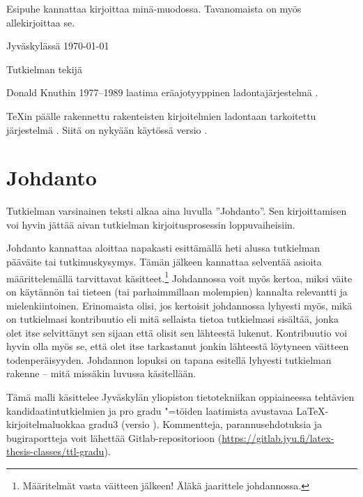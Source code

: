 \documentclass[utf8]{gradu3}
\begin{document}
Esipuhe kannattaa kirjoittaa minä-muodossa. Tavanomaista on myös
allekirjoittaa se.

Jyväskylässä \today

\bigskip

Tutkielman tekijä

\begin{thetermlist}
\item[\TeX] Donald Knuthin 1977--1989 laatima eräajotyyppinen
  ladontajärjestelmä \parencite[ks.][]{knuth86:_texbook}. 
\item[\LaTeX] \TeX in \parencite[ks.][]{knuth86:_texbook} päälle
  rakennettu rakenteisten kirjoitelmien ladontaan tarkoitettu
  järjestelmä \parencite[ks.][]{lamport94:_latex}.  Siitä on nykyään
  käytössä versio \LaTeXe.
\end{thetermlist}

\mainmatter

\chapter{Johdanto}

Tutkielman varsinainen teksti alkaa aina luvulla ''Johdanto''.  Sen
kirjoittamisen voi hyvin jättää aivan tutkielman kirjoitusprosessin
loppuvaiheisiin.

Johdanto kannattaa aloittaa napakasti esittämällä heti alussa
tutkielman pääväite tai tutkimuskysymys.  Tämän jälkeen kannattaa
selventää asioita määrittelemällä tarvittavat
käsitteet.\footnote{Määritelmät vasta väitteen jälkeen! Äläkä
  jaarittele johdannossa.}  Johdannossa voit myös kertoa, miksi väite
on käytännön tai tieteen (tai parhaimmillaan molempien) kannalta
relevantti ja mielenkiintoinen.  Erinomaista olisi, jos kertoisit
johdannossa lyhyesti myös, mikä on tutkielmasi kontribuutio eli mitä
sellaista tietoa tutkielmasi sisältää, jonka olet itse selvittänyt sen
sijaan että olisit sen lähteestä lukenut.  Kontribuutio voi hyvin olla
myös se, että olet itse tarkastanut jonkin lähteestä löytyneen
väitteen todenperäisyyden.  Johdannon lopuksi on tapana esitellä
lyhyesti tutkielman rakenne -- mitä missäkin luvussa käsitellään.

Tämä malli käsittelee Jyväskylän yliopiston tietotekniikan oppiaineessa
tehtävien kandidaatintutkielmien ja pro gradu "=töiden laatimista
avustavaa \LaTeX-kirjoitelmaluokkaa gradu3 (versio \graduclsversion).
Kommentteja, parannusehdotuksia ja bugiraportteja voit lähettää
Gitlab-repositorioon
(\url{https://gitlab.jyu.fi/latex-thesis-classes/ttl-gradu}).
\end{document}
